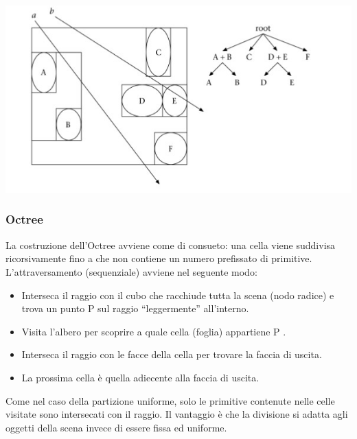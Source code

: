 \documentclass[a4paper, 10pt]{article}
\begin{document}
		\begin{center}
			\includegraphics[scale=0.5]{volumiger}
		\end{center}
	
	\subsubsection{Octree}
	La costruzione dell’Octree avviene come di consueto: una cella viene suddivisa ricorsivamente fino a che non contiene un numero prefissato di primitive. L’attraversamento (sequenziale) avviene nel seguente modo:
	\begin{itemize}
		\item Interseca il raggio con il cubo che racchiude tutta la scena (nodo
		radice) e trova un punto P sul raggio “leggermente” all’interno.
		\item Visita l’albero per scoprire a quale cella (foglia) appartiene P .
		\item Interseca il raggio con le facce della cella per trovare la faccia di
		uscita.
		\item La prossima cella è quella adiecente alla faccia di uscita.
	\end{itemize}
	Come nel caso della partizione uniforme, solo le primitive contenute nelle celle visitate sono intersecati con il raggio. Il vantaggio è che la divisione si adatta agli oggetti della scena
	invece di essere fissa ed uniforme.
	
\end{document}
